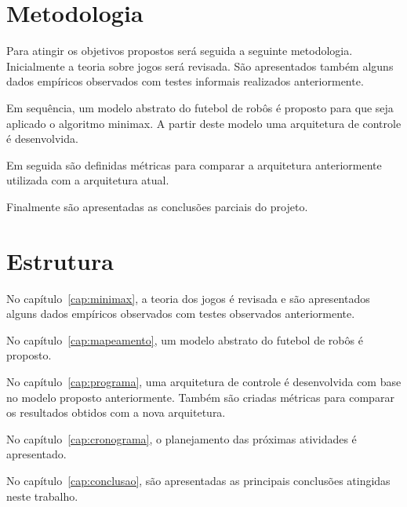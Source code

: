 \section{Metodologia}

Para atingir os objetivos propostos será seguida a seguinte metodologia.
Inicialmente a teoria sobre jogos será revisada. São apresentados também
alguns dados empíricos observados com testes informais realizados anteriormente.

Em sequência, um modelo abstrato do futebol de robôs é proposto para que seja
aplicado o algoritmo minimax. A partir deste modelo uma arquitetura de controle
é desenvolvida.

Em seguida são definidas métricas para comparar a arquitetura anteriormente
utilizada com a arquitetura atual.

Finalmente são apresentadas as conclusões parciais do projeto.

\section{Estrutura}

No capítulo~\ref{cap:minimax}, a teoria dos jogos é revisada e são apresentados
alguns dados empíricos observados com testes observados anteriormente.

No capítulo~\ref{cap:mapeamento}, um modelo abstrato do futebol de robôs é
proposto.

No capítulo~\ref{cap:programa}, uma arquitetura de controle é desenvolvida com
base no modelo proposto anteriormente. Também são criadas métricas para
comparar os resultados obtidos com a nova arquitetura.

No capítulo~\ref{cap:cronograma}, o planejamento das próximas atividades é
apresentado.

No capítulo~\ref{cap:conclusao}, são apresentadas as principais conclusões
atingidas neste trabalho.

